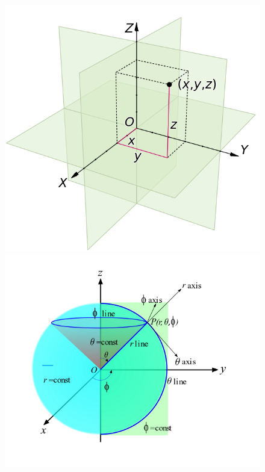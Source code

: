 \documentclass{article}
\theoremstyle{definition}
\begin{document}
\begin{figure}[h!]
	\centering
	\includegraphics[scale=0.2]{gr-fig-4a.png}
	\includegraphics[scale=0.25]{gr-fig-4b.png}

\end{figure}
\end{document}
